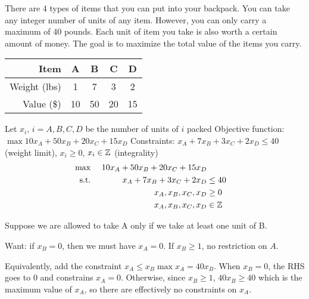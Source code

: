 \documentclass[class=co250,tikz,notes]{agony}
\begin{document}
\begin{example}
  There are 4 types of items that you can put into your backpack. You can take any integer number of units of any item. However, you can only carry a maximum of 40 pounds. Each unit of item you take is also worth a certain amount of money. The goal is to maximize the total value of the items you carry.
  \begin{center}
    \begin{tabular}{r|cccc}
      Item         & A  & B  & C  & D  \\ \hline
      Weight (lbs) & 1  & 7  & 3  & 2  \\
      Value (\$)   & 10 & 50 & 20 & 15 \\
    \end{tabular}
  \end{center}
\end{example}
\begin{sol}
  Let $x_i$, $i = A,B,C,D$ be the number of units of $i$ packed
  Objective function: $\max 10x_A + 50x_B + 20x_C + 15x_D$
  Constraints: $x_A + 7x_B + 3x_C + 2x_D \leq 40$ (weight limit), $x_i \geq 0$, $x_i \in \mathbb{Z}$ (integrality)
  \begin{align*}\max\ && 10x_A + 50x_B + 20x_C + 15x_D \\ \text{s.t.}\ && x_A + 7x_B + 3x_C + 2x_D &\leq 40 \\ && x_A,x_B,x_C,x_D &\geq 0 \\ && x_A,x_B,x_C,x_D &\in \Z\end{align*}
\end{sol}

\begin{example}
  Suppose we are allowed to take A only if we take at least one unit of B.
\end{example}
\begin{sol}
  Want: if $x_B = 0$, then we must have $x_A = 0$. If $x_B \geq 1$, no restriction on $A$.

  Equivalently, add the constraint $x_A \leq x_B \max x_A = 40x_B$. When $x_B = 0$, the RHS goes to $0$ and constrains $x_A = 0$. Otherwise, since $x_B \geq 1$, $40x_B \geq 40$ which is the maximum value of $x_A$, so there are effectively no constraints on $x_A$.
\end{sol}
\end{document}
